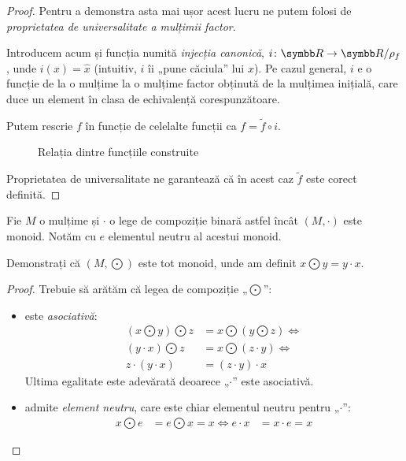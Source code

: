 \begin{proof}
Pentru a demonstra asta mai ușor acest lucru ne putem folosi de \emph{proprietatea de universalitate a mulțimii factor}. 

Introducem acum și funcția numită \emph{injecția canonică}, \(\function{i}{\reals}{\reals/\rho_f}\), unde \(i(x) = \widehat{x}\) (intuitiv, \(i\) îi „pune căciula” lui \(x\)). Pe cazul general, \(i\) e o funcție de la o mulțime la o mulțime factor obținută de la mulțimea inițială, care duce un element în clasa de echivalență corespunzătoare.

Putem rescrie \(f\) în funcție de celelalte funcții ca \(f = \tilde{f} \circ i\).

\begin{figure}[h]
    \centering
    \caption*{Relația dintre funcțiile construite}
\end{figure}

Proprietatea de universalitate ne garantează că în acest caz \(\tilde{f}\) este corect definită.
\end{proof}

\begin{exercise}
Fie \(M\) o mulțime și \(\cdot\) o lege de compoziție binară astfel încât \((M, \cdot)\) este monoid. Notăm cu \(e\) elementul neutru al acestui monoid.

Demonstrați că \((M, \bigodot)\) este tot monoid, unde am definit \(x \bigodot y = y \cdot x\).
\end{exercise}
\begin{proof}
Trebuie să arătăm că legea de compoziție „\(\bigodot\)”:
\begin{itemize}
    \item este \emph{asociativă}:
    \begin{align*}
        (x \bigodot y) \bigodot z &= x \bigodot (y \bigodot z) \iff \\
        (y \cdot x) \bigodot z &= x \bigodot (z \cdot y) \iff \\
        z \cdot (y \cdot x) &= (z \cdot y) \cdot x
    \end{align*}
    Ultima egalitate este adevărată deoarece „\(\cdot\)” este asociativă.
    \item admite \emph{element neutru}, care este chiar elementul neutru pentru „\(\cdot\)”:
    \begin{align*}
        x \bigodot e &= e \bigodot x = x \iff e \cdot x &= x \cdot e = x
    \end{align*}
\end{itemize}
\end{proof}

